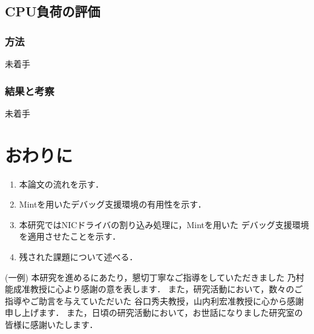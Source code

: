\documentclass[tanilab-enum]{graduate}
\begin{document}
\section{CPU負荷の評価}
    \subsection{方法}
    未着手
    \subsection{結果と考察}
    未着手
\chapter{おわりに}\label{conclusion}
\begin{enumerate}
    \item 本論文の流れを示す．
    \item Mintを用いたデバッグ支援環境の有用性を示す．
    \item 本研究ではNICドライバの割り込み処理に，Mintを用いた
        デバッグ支援環境を適用させたことを示す．
    \item 残された課題について述べる．
\end{enumerate}


\acknowledgment\label{acknowledgement} %

(一例)
本研究を進めるにあたり，懇切丁寧なご指導をしていただきました
乃村能成准教授に心より感謝の意を表します．
また，研究活動において，数々のご指導やご助言を与えていただいた
谷口秀夫教授，山内利宏准教授に心から感謝申し上げます．
また，日頃の研究活動において，お世話になりました研究室の
皆様に感謝いたします．





\end{document}
